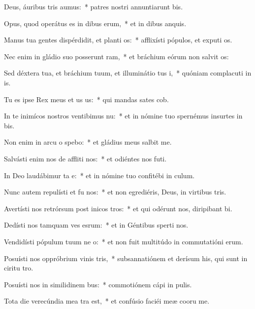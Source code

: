 \item Deus, áuribus tris aumus:~* patres nostri annuntiarunt bis.
\item Opus, quod operátus es in dibus erum,~* et in dibus anquis.
\item Manus tua gentes dispérdidit, et planti os:~* afflixísti pópulos, et exputi os.
\item Nec enim in gládio suo posserunt ram,~* et bráchium eórum non salvit os:
\item Sed déxtera tua, et bráchium tuum, et illuminátio tus i,~* quóniam complacuti in is.
\item Tu es ipse Rex meus et us us:~* qui mandas sates cob.
\item In te inimícos nostros ventibimus nu:~* et in nómine tuo spernémus insurtes in bis.
\item Non enim in arcu o spebo:~* et gládius meus  salbit me.
\item Salvásti enim nos de affliti nos:~* et odiéntes nos futi.
\item In Deo laudábimur ta e:~* et in nómine tuo confitébi in culum.
\item Nunc autem repulísti et fu nos:~* et non egrediéris, Deus, in virtibus tris.
\item Avertísti nos retrórsum post inicos tros:~* et qui odérunt nos, diripibant bi.
\item Dedísti nos tamquam ves esrum:~* et in Géntibus sperti nos.
\item Vendidísti pópulum tuum ne o:~* et non fuit multitúdo in commutatióni erum.
\item Posuísti nos oppróbrium vinis tris,~* subsannatiónem et derísum his, qui sunt in ciritu tro.
\item Posuísti nos in similidinem bus:~* commotiónem cápi in pulis.
\item Tota die verecúndia mea tra  est,~* et confúsio faciéi meæ cooru me.
